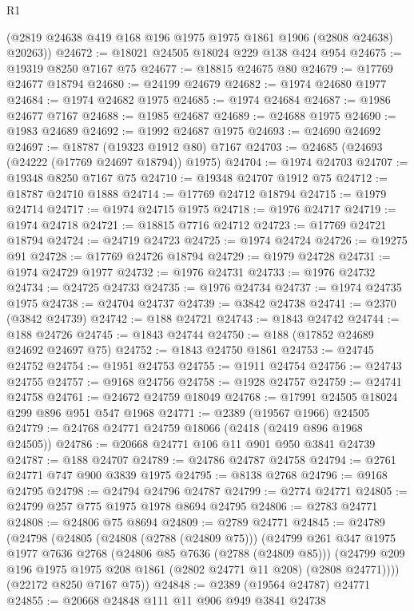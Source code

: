 \begin{lexlean}{R1}
\begin{coremodule}
      (@2819 @24638 @419 @168 @196 @1975 @1975 @1861 @1906 (@2808 @24638) @20263))
@24672 := @18021 @24505 @18024 @229 @138 @424 @954
@24675 := @19319 @8250 @7167 @75
@24677 := @18815 @24675 @80
@24679 := @17769 @24677 @18794
@24680 := @24199 @24679
@24682 := @1974 @24680 @1977
@24684 := @1974 @24682 @1975
@24685 := @1974 @24684
@24687 := @1986 @24677 @7167
@24688 := @1985 @24687
@24689 := @24688 @1975
@24690 := @1983 @24689
@24692 := @1992 @24687 @1975
@24693 := @24690 @24692
@24697 := @18787 (@19323 @1912 @80) @7167
@24703 := @24685 (@24693 (@24222 (@17769 @24697 @18794)) @1975)
@24704 := @1974 @24703
@24707 := @19348 @8250 @7167 @75
@24710 := @19348 @24707 @1912 @75
@24712 := @18787 @24710 @1888
@24714 := @17769 @24712 @18794
@24715 := @1979 @24714
@24717 := @1974 @24715 @1975
@24718 := @1976 @24717
@24719 := @1974 @24718
@24721 := @18815 @7716 @24712
@24723 := @17769 @24721 @18794
@24724 := @24719 @24723
@24725 := @1974 @24724
@24726 := @19275 @91
@24728 := @17769 @24726 @18794
@24729 := @1979 @24728
@24731 := @1974 @24729 @1977
@24732 := @1976 @24731
@24733 := @1976 @24732
@24734 := @24725 @24733
@24735 := @1976 @24734
@24737 := @1974 @24735 @1975
@24738 := @24704 @24737
@24739 := @3842 @24738
@24741 := @2370 (@3842 @24739)
@24742 := @188 @24721
@24743 := @1843 @24742
@24744 := @188 @24726
@24745 := @1843 @24744
@24750 := @188 (@17852 @24689 @24692 @24697 @75)
@24752 := @1843 @24750 @1861
@24753 := @24745 @24752
@24754 := @1951 @24753
@24755 := @1911 @24754
@24756 := @24743 @24755
@24757 := @9168 @24756
@24758 := @1928 @24757
@24759 := @24741 @24758
@24761 := @24672 @24759 @18049
@24768 := @17991 @24505 @18024 @299 @896 @951 @547 @1968
@24771 := @2389 (@19567 @1966) @24505
@24779 := @24768 @24771 @24759 @18066 (@2418 (@2419 @896 @1968 @24505))
@24786 := @20668 @24771 @106 @11 @901 @950 @3841 @24739
@24787 := @188 @24707
@24789 := @24786 @24787 @24758
@24794 := @2761 @24771 @747 @900 @3839 @1975
@24795 := @8138 @2768
@24796 := @9168 @24795
@24798 := @24794 @24796 @24787
@24799 := @2774 @24771
@24805 := @24799 @257 @775 @1975 @1978 @8694 @24795
@24806 := @2783 @24771
@24808 := @24806 @75 @8694
@24809 := @2789 @24771
@24845 := @24789
    (@24798
      (@24805
        (@24808 (@2788 (@24809 @75)))
        (@24799
          @261
          @347
          @1975
          @1977
          @7636
          @2768
          (@24806 @85 @7636 (@2788 (@24809 @85)))
          (@24799 @209 @196 @1975 @1975 @208 @1861 (@2802 @24771 @11 @208) (@2808 @24771))))
      (@22172 @8250 @7167 @75))
@24848 := @2389 (@19564 @24787) @24771
@24855 := @20668 @24848 @111 @11 @906 @949 @3841 @24738

\end{coremodule}
\end{lexlean}
